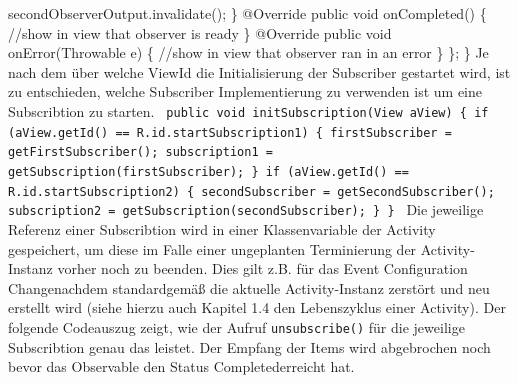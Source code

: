 \documentclass[12pt,oneside,a4paper,bibtotoc,liststotoc]{scrreprt}
\begin{document}
{\newline
               secondObserverOutput.invalidate();\newline
           \}\newline
\newline
           @Override\newline
           public void onCompleted() \{\newline
               //show in view that observer is ready\newline
           \}\newline
\newline
           @Override\newline
           public void onError(Throwable e) \{\newline
               //show in view that observer ran in an error\newline
           \}\newline
       \};\newline
   \}\newline
   }\newline
Je nach dem über welche ViewId die Initialisierung der Subscriber gestartet wird, ist zu entschieden, welche Subscriber Implementierung zu verwenden ist um eine Subscribtion zu starten.\newline
\texttt{\newline
 public void initSubscription(View aView) \{\newline
       if (aView.getId() == R.id.startSubscription1) \{\newline
           firstSubscriber = getFirstSubscriber();\newline
           subscription1 = getSubscription(firstSubscriber);\newline
\newline
       \}\newline
       if (aView.getId() == R.id.startSubscription2) \{\newline
           secondSubscriber = getSecondSubscriber();\newline
\newline
           subscription2 = getSubscription(secondSubscriber);\newline
       \}\newline
   \}\newline
}\newline
Die jeweilige Referenz einer Subscribtion wird in einer Klassenvariable der Activity gespeichert, um diese im Falle einer ungeplanten Terminierung der Activity-Instanz vorher noch zu beenden. Dies gilt z.B. für das Event \grqq Configuration Change\grqq nachdem standardgemäß die aktuelle Activity-Instanz zerstört und neu erstellt wird (siehe hierzu auch Kapitel 1.4 den Lebenszyklus einer Activity). Der folgende Codeauszug zeigt, wie der Aufruf \texttt{unsubscribe()} für die jeweilige Subscribtion genau das leistet. Der Empfang der Items wird abgebrochen noch bevor das Observable den Status \grqq Completed\grqq erreicht hat.\newline
\end{document}
